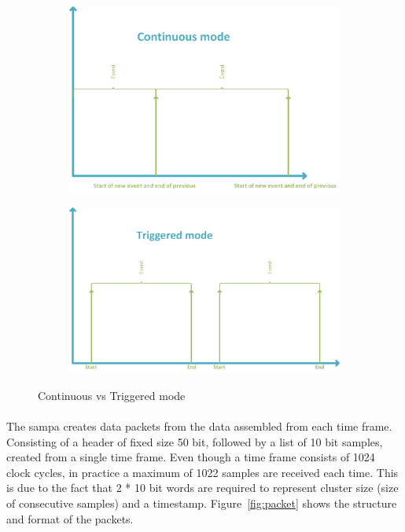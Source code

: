 \documentclass[a4paper, 12pt]{report}
\begin{document}
\begin{figure}[t!]
	\label{fig:cont-vs-trig}
	\centering
		\begin{subfigure}[]{0.9\textwidth}
			\label{fig:cont}
			\includegraphics[width=\textwidth]{images/cont-mode.png}
		\end{subfigure}
		\begin{subfigure}[]{0.9\textwidth}
			\label{fig:trig}
			\includegraphics[width=\textwidth]{images/triggered-mode.png}
		\end{subfigure}
	\caption{Continuous vs Triggered mode}
\end{figure}

\paragraph{}
The \gls{sampa} creates data packets from the data assembled from each time frame.
Consisting of a header of fixed size 50 bit, followed by a list of 10 bit samples, created from a single time frame.
Even though a time frame consists of 1024 clock cycles, in practice a maximum of 1022 samples are received each time.
This is due to the fact that 2 * 10 bit words are required to represent cluster size (size of consecutive samples) and a timestamp.
Figure~\ref{fig:packet} shows the structure and format of the packets.
\end{document}
